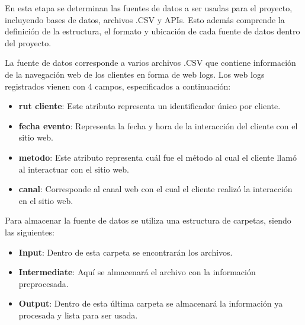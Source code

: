 En esta etapa se determinan las fuentes de datos a ser usadas para el proyecto, incluyendo bases de datos, archivos .CSV y APIs. Esto además comprende la definición de la estructura, el formato y ubicación de cada fuente de datos dentro del proyecto.

La fuente de datos corresponde a varios archivos .CSV que contiene información de la navegación web de los clientes en forma de web logs. Los web logs registrados vienen con 4 campos, especificados a continuación:

\begin{itemize}
\item \textbf{rut cliente}: Este atributo representa un identificador único por cliente.
\item \textbf{fecha evento}: Representa la fecha y hora de la interacción del cliente con el sitio web.
\item \textbf{metodo}: Este atributo representa cuál fue el método al cual el cliente llamó al interactuar con el sitio web.
\item \textbf{canal}: Corresponde al canal web con el cual el cliente realizó la interacción en el sitio web.
\end{itemize}

Para almacenar la fuente de datos se utiliza una estructura de carpetas, siendo las siguientes:

\begin{itemize}
\item \textbf{Input}: Dentro de esta carpeta se encontrarán los archivos.
\item \textbf{Intermediate}: Aquí se almacenará el archivo con la información preprocesada.
\item \textbf{Output}: Dentro de esta última carpeta se almacenará la información ya procesada y lista para ser usada.
\end{itemize}